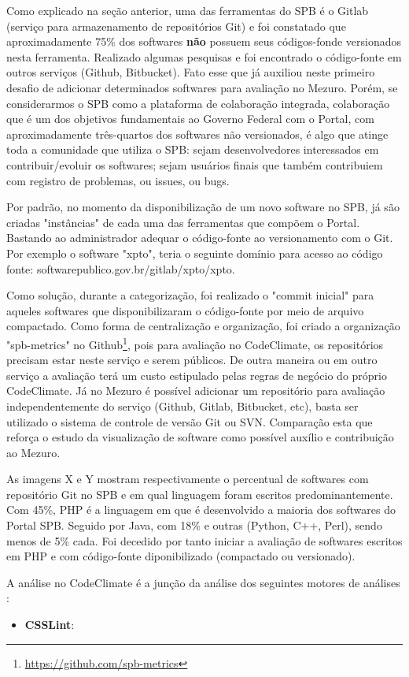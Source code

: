 Como explicado na seção anterior, uma das ferramentas do SPB é o Gitlab (serviço para armazenamento de repositórios Git) e foi constatado que aproximadamente 75\% dos softwares \textbf{não} possuem seus códigos-fonde versionados nesta ferramenta. Realizado algumas pesquisas e foi encontrado o código-fonte em outros serviços (Github, Bitbucket). Fato esse que já auxiliou neste primeiro desafio de adicionar determinados softwares para avaliação no Mezuro. Porém, se considerarmos o SPB como a plataforma de colaboração integrada, colaboração que é um dos objetivos fundamentais ao Governo Federal com o Portal, com aproximadamente três-quartos dos softwares não versionados, é algo que atinge toda a comunidade que utiliza o SPB: sejam desenvolvedores interessados em contribuir/evoluir os softwares; sejam usuários finais que também contribuiem com registro de problemas, ou issues, ou bugs.

Por padrão, no momento da disponibilização de um novo software no SPB, já são criadas "instâncias" de cada uma das ferramentas que compõem o Portal. Bastando ao administrador adequar o código-fonte ao versionamento com o Git. Por exemplo o software "xpto", teria o seguinte domínio para acesso ao código fonte: softwarepublico.gov.br/gitlab/xpto/xpto.

Como solução, durante a categorização, foi realizado o "commit inicial" para aqueles softwares que disponibilizaram o código-fonte por meio de arquivo compactado. Como forma de centralização e organização, foi criado a organização "spb-metrics" no Github\footnote{\url{https://github.com/spb-metrics}}, pois para avaliação no CodeClimate, os repositórios precisam estar neste serviço e serem públicos. De outra maneira ou em outro serviço a avaliação terá um custo estipulado pelas regras de negócio do próprio CodeClimate. Já no Mezuro é possível adicionar um repositório para avaliação independentemente do serviço (Github, Gitlab, Bitbucket, etc), basta ser utilizado o sistema de controle de versão Git ou SVN. Comparação esta que reforça o estudo da visualização de software como possível auxílio e contribuição ao Mezuro.

As imagens X e Y mostram respectivamente o percentual de softwares com repositório Git no SPB e em qual linguagem foram escritos predominantemente. Com 45\%, PHP é a linguagem em que é desenvolvido a maioria dos softwares do Portal SPB. Seguido por Java, com 18\% e outras (Python, C++, Perl), sendo menos de 5\% cada. Foi decedido por tanto iniciar a avaliação de softwares escritos em PHP e com código-fonte diponibilizado (compactado ou versionado).


A análise no CodeClimate é a junção da análise dos seguintes motores de análises \cite{enginesCodeClimate}:


\begin{itemize}
  \item \textbf{CSSLint}:
\end{itemize}
